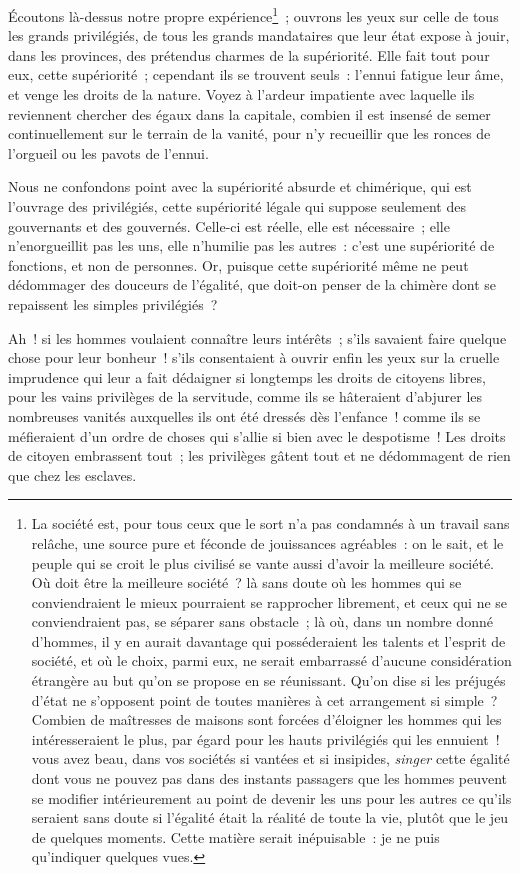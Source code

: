 \documentclass[french,twoside]{book} %
\begin{document}
Écoutons là-dessus notre propre expérience\footnote{La société est, pour tous ceux que le sort n’a pas condamnés à un travail sans relâche, une source pure et féconde de jouissances agréables : on le sait, et le peuple qui se croit le plus civilisé se vante aussi d’avoir la meilleure société. Où doit être la meilleure société ? là sans doute où les hommes qui se conviendraient le mieux pourraient se rapprocher librement, et ceux qui ne se conviendraient pas, se séparer sans obstacle ; là où, dans un nombre donné d’hommes, il y en aurait davantage qui posséderaient les talents et l’esprit de société, et où le choix, parmi eux, ne serait embarrassé d’aucune considération étrangère au but qu’on se propose en se réunissant. Qu’on dise si les préjugés d’état ne s’opposent point de toutes manières à cet arrangement si simple ? Combien de maîtresses de maisons sont forcées d’éloigner les hommes qui les intéresseraient le plus, par égard pour les hauts privilégiés qui les ennuient ! vous avez beau, dans vos sociétés si vantées et si insipides, {\itshape singer} cette égalité dont vous ne pouvez pas dans des instants passagers que les hommes peuvent se modifier intérieurement au point de devenir les uns pour les autres ce qu’ils seraient sans doute si l’égalité était la réalité de toute la vie, plutôt que le jeu de quelques moments. Cette matière serait inépuisable : je ne puis qu’indiquer quelques vues.} ; ouvrons les yeux sur celle de tous les grands privilégiés, de tous les grands mandataires que leur état expose à jouir, dans les provinces, des prétendus charmes de la supériorité. Elle fait tout pour eux, cette supériorité ; cependant ils se trouvent seuls : l’ennui fatigue leur âme, et venge les droits de la nature. Voyez à l’ardeur impatiente avec laquelle ils reviennent chercher des égaux dans la capitale, combien il est insensé de semer continuellement sur le terrain de la vanité, pour n’y recueillir que les ronces de l’orgueil ou les pavots de l’ennui.\par
Nous ne confondons point avec la supériorité absurde et chimérique, qui est l’ouvrage des privilégiés, cette supériorité légale qui suppose seulement des gouvernants et des gouvernés. Celle-ci est réelle, elle est nécessaire ; elle n’enorgueillit pas les uns, elle n’humilie pas les autres : c’est une supériorité de fonctions, et non de personnes. Or, puisque cette supériorité même ne peut dédommager des douceurs de l’égalité, que doit-on penser de la chimère dont se repaissent les simples privilégiés ?\par
Ah ! si les hommes voulaient connaître leurs intérêts ; s’ils savaient faire quelque chose pour leur bonheur ! s’ils consentaient à ouvrir enfin les yeux sur la cruelle imprudence qui leur a fait dédaigner si longtemps les droits de citoyens libres, pour les vains privilèges de la servitude, comme ils se hâteraient d’abjurer les nombreuses vanités auxquelles ils ont été dressés dès l’enfance ! comme ils se méfieraient d’un ordre de choses qui s’allie si bien avec le despotisme ! Les droits de citoyen embrassent tout ; les privilèges gâtent tout et ne dédommagent de rien que chez les esclaves.\par
\end{document}
